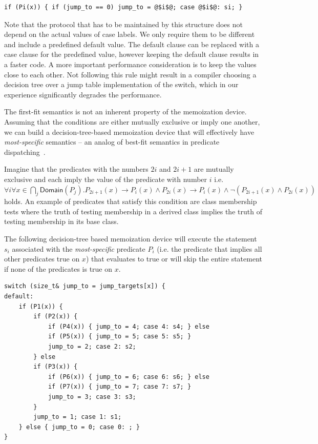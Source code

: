 \begin{lstlisting}
if (Pi(x)) { if (jump_to == 0) jump_to = @$i$@; case @$i$@: si; }
\end{lstlisting}

\noindent
Note that the protocol that has to be maintained by this structure does not 
depend on the actual values of case labels. We only require them to be 
different and include a predefined default value. The default clause can be 
replaced with a case clause for the predefined value, however keeping the default  
clause results in a faster code. A more important performance consideration is to 
keep the values close to each other. Not following this rule might result in a 
compiler choosing a decision tree over a jump table implementation of the 
switch, which in our experience significantly degrades the performance.

The first-fit semantics is not an inherent property of the memoization device. 
Assuming that the conditions are either mutually exclusive or imply one another, we 
can build a decision-tree-based memoization device that will effectively have 
\emph{most-specific} semantics -- an analog of best-fit semantics in predicate 
dispatching~\cite{ErnstKC98}.

Imagine that the predicates with the numbers $2i$ and $2i+1$ are mutually exclusive and 
each imply the value of the predicate with number $i$ i.e.
$\forall i\forall x\in\bigcap_j\mathsf{Domain}(P_j).P_{2i+1}(x)\rightarrow P_i(x)\wedge P_{2i}(x)\rightarrow P_i(x)\wedge\neg(P_{2i+1}(x)\wedge P_{2i}(x))$ holds. 
An example of predicates that satisfy this condition are class membership tests 
where the truth of testing membership in a derived class implies the truth of 
testing membership in its base class. 

The following decision-tree based memoization device will execute the statement 
$s_i$ associated with the \emph{most-specific} predicate $P_i$ (i.e. the 
predicate that implies all other predicates true on $x$) that evaluates to true 
or will skip the entire statement if none of the predicates is true on $x$.

\begin{lstlisting}
switch (size_t& jump_to = jump_targets[x]) {
default:
    if (P1(x)) {
        if (P2(x)) {
            if (P4(x)) { jump_to = 4; case 4: s4; } else
            if (P5(x)) { jump_to = 5; case 5: s5; } 
            jump_to = 2; case 2: s2;
        } else
        if (P3(x)) {
            if (P6(x)) { jump_to = 6; case 6: s6; } else
            if (P7(x)) { jump_to = 7; case 7: s7; } 
            jump_to = 3; case 3: s3;
        }
        jump_to = 1; case 1: s1;
    } else { jump_to = 0; case 0: ; }
}
\end{lstlisting}

